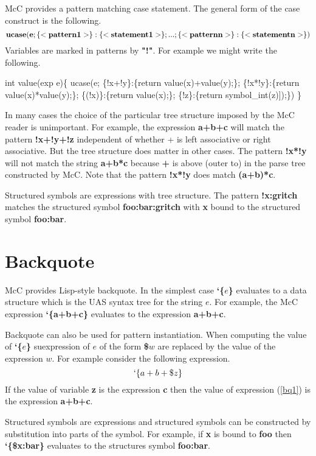 \documentclass{article}
\begin{document}
McC provides a pattern matching case statement.
The general form of the case construct is the following.
$${\bf ucase(e; \{<pattern1>\}:\{<statement1>\}; ... ;\{<patternn>\}:\{<statementn>\})}$$
Variables are marked in patterns by {\bf"!"}. For example we might write the following.

\begin{code}
int value(exp e)\{
  ucase(e;
   \{!x+!y\}:\{return value(x)+value(y);\};
   \{!x*!y\}:\{return value(x)*value(y);\};
   \{(!x)\}:\{return value(x);\};
   \{!z\}:\{return symbol\_int(z)]);\})
\}
\end{code}

In many cases the choice of the particular tree structure imposed by the McC reader is unimportant.  For example, the expression {\bf a+b+c} will match the pattern
{\bf !x+!y+!z} independent of whether + is left associative or right associative.  But the tree structure does matter in other cases.  The pattern {\bf !x*!y}
will not match the string {\bf a+b*c} because {\bf +} is above (outer to) {\bf *} in the parse tree constructed by McC. Note that the pattern {\bf !x*!y} does match {\bf (a+b)*c}.

Structured symbols are expressions with tree structure.  The pattern {\bf !x:gritch} matches the structured symbol {\bf foo:bar:gritch} with {\bf x} bound to the structured symbol {\bf foo:bar}.

\section{Backquote}

McC provides Lisp-style backquote.
In the simplest case {\bf `\{$e$\}} evaluates to a data structure which is the UAS syntax tree for
the string $e$.  For example, the McC expression {\bf `\{a+b+c\}}
evaluates to the expression {\bf a+b+c}.

Backquote can also be used for pattern instantiation.
When computing the value of {\bf `\{$e$\}} suexpression of $e$ of the form {\bf \$$w$} are replaced by the value of the expression $w$.
For example consider the following expression.
\begin{equation}
\label{bq1}
`\{a+b+\$z\}
\end{equation}
If the value of variable {\bf z} is the expression {\bf c} then the value of expression (\ref{bq1}) is the expression {\bf a+b+c}.

Structured symbols are expressions and structured symbols can be constructed by substitution into parts of the symbol.
For example, if {\bf x} is bound to {\bf foo} then {\bf `\{\$x:bar\}} evaluates to the structures symbol {\bf foo:bar}.
\end{document}
